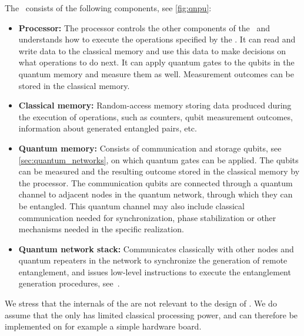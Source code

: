 The \QNPU\ consists of the following components, see \cref{fig:qnpu}:
\begin{itemize}
    \item \textbf{Processor:}
            The processor controls the other components of the \QNPU\ and understands how to execute the operations specified by the \host.
            It can read and write data to the classical memory and use this data to make decisions on what operations to do next.
            It can apply quantum gates to the qubits in the quantum memory and measure them as well.
            Measurement outcomes can be stored in the classical memory.
    \item \textbf{Classical memory:}
            Random-access memory storing data produced during the execution of operations, such as counters, qubit measurement outcomes, information about generated entangled pairs, etc.
    \item \textbf{Quantum memory:}
            Consists of communication and storage qubits, see \cref{sec:quantum_networks}, on which quantum gates can be applied.
            The qubits can be measured and the resulting outcome stored in the classical memory by the processor.
            The communication qubits are connected through a quantum channel to adjacent nodes in the quantum network, through which they can be entangled.
            This quantum channel may also include classical communication needed for synchronization, phase stabilization or other mechanisms needed in the specific realization.
    \item \textbf{Quantum network stack:}
            Communicates classically with other nodes and quantum repeaters in the network to synchronize the generation of remote entanglement, and issues low-level instructions to execute the entanglement generation procedures, see~\cite{dahlberg2019linklayer,kozlowski2020networklayer}.
\end{itemize}

We stress that the internals of the \QNPU are not relevant to the design of \netqasm.
We do assume that the \QNPU only has limited classical processing power, and can therefore be implemented on for example a simple hardware board.


